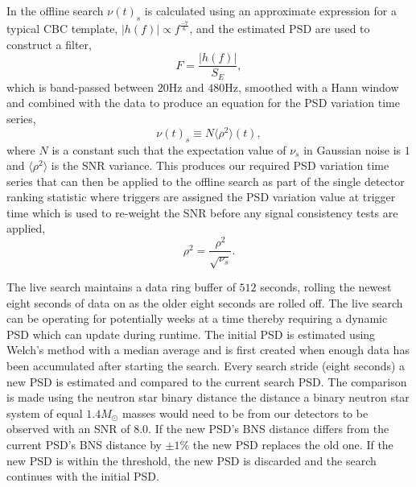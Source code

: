 In the offline search $\nu(t)_{s}$ is calculated using an approximate expression for a typical CBC template, $|h(f)| \propto f^{\frac{-7}{6}}$, and the estimated PSD are used to construct a filter,
%
\begin{equation}
    F = \frac{|h(f)|}{S_{E}} ,
\end{equation}
%
which is band-passed between $20$Hz and $480$Hz, smoothed with a Hann window and combined with the data to produce an equation for the PSD variation time series,
%
\begin{equation}
    \nu(t)_{s} \equiv N \langle\rho^{2}\rangle(t), 
\end{equation}
%
where $N$ is a constant such that the expectation value of $\nu_{s}$ in Gaussian noise is $1$ and $\langle\rho^{2}\rangle$ is the SNR variance. This produces our required PSD variation time series that can then be applied to the offline search as part of the single detector ranking statistic where triggers are assigned the PSD variation value at trigger time which is used to re-weight the SNR before any signal consistency tests are applied,
%
\begin{equation}
    \rho^{2} = \frac{\rho^{2}}{\sqrt{\nu_{s}}} .
\end{equation}


The live search maintains a data ring buffer of $512$ seconds, rolling the newest eight seconds of data on as the older eight seconds are rolled off. The live search can be operating for potentially weeks at a time thereby requiring a dynamic PSD which can update during runtime. The initial PSD is estimated using Welch's method with a median average and is first created when enough data has been accumulated after starting the search. Every search stride (eight seconds) a new PSD is estimated and compared to the current search PSD. The comparison is made using the neutron star binary distance the distance a binary neutron star system of equal $1.4 M_{\odot}$ masses would need to be from our detectors to be observed with an SNR of $8.0$. If the new PSD's BNS distance differs from the current PSD's BNS distance by $\pm1\%$ the new PSD replaces the old one. If the new PSD is within the threshold, the new PSD is discarded and the search continues with the initial PSD. 

